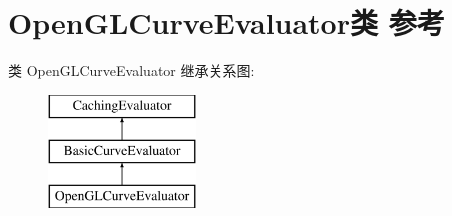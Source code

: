 \hypertarget{class_open_g_l_curve_evaluator}{}\section{Open\+G\+L\+Curve\+Evaluator类 参考}
\label{class_open_g_l_curve_evaluator}
类 Open\+G\+L\+Curve\+Evaluator 继承关系图\+:\begin{figure}[H]
\begin{center}
\leavevmode
\includegraphics[height=3.000000cm]{class_open_g_l_curve_evaluator}
\end{center}
\end{figure}
